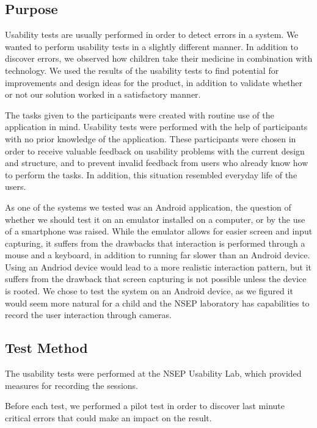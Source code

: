 \subsection{Purpose}
\label{sec:usabilitypurpose}
Usability tests are usually performed in order to detect errors in a system. We wanted to perform usability tests in a slightly different manner. In addition to discover errors, we observed how children take their medicine in combination with technology. We used the results of the usability tests to find potential for improvements and design ideas for the product, in addition to validate whether or not our solution worked in a satisfactory manner.
 
The tasks given to the participants were created with routine use of the application in mind. Usability tests were performed with the help of participants with no prior knowledge of the application. These participants were chosen in order to receive valuable feedback on usability problems with the current design and structure, and to prevent invalid feedback from users who already know how to perform the tasks. In addition, this situation resembled everyday life of the users.

As one of the systems we tested was an Android application, the question of whether we should test it on an emulator installed on a computer, or by the use of a smartphone was raised. While the emulator allows for easier screen and input capturing, it suffers from the drawbacks that interaction is performed through a mouse and a keyboard, in addition to running far slower than an Android device. Using an Andriod device would lead to a more realistic interaction pattern, but it suffers from the drawback that screen capturing is not possible unless the device is rooted. We chose to test the system on an Android device, as we figured it would seem more natural for a child and the NSEP laboratory has capabilities to record the user interaction through cameras.  


\subsection{Test Method}
\label{sec:testmethod}

The usability tests were performed at the NSEP Usability Lab, which provided measures for recording the sessions.  

Before each test, we performed a pilot test in order to discover last minute critical errors that could make an impact on the result.

